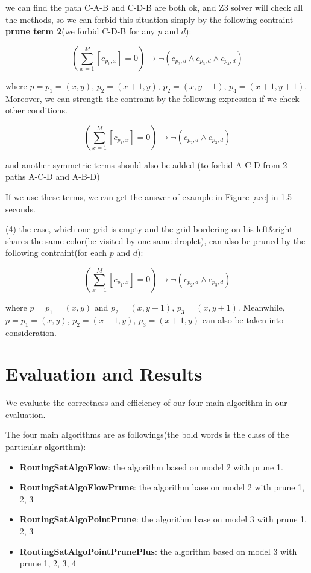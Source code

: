 \documentclass[twocolumn]{article}
\begin{document}
we can find the path C-A-B and C-D-B are both ok, and Z3 solver will check all the methods, so we can forbid this situation simply by the following contraint \textbf{prune term 2}(we forbid C-D-B for any $p$ and $d$):

\[
(\sum_{x=1}^{M}{[c_{p_1,x}]} = 0) \to \neg(c_{p_2,d} \wedge c_{p_3,d} \wedge c_{p_4,d})
\]

where $p = p_1 = (x, y)$, $p_2 = (x + 1, y)$, $p_2 = (x, y + 1)$, $p_4 = (x + 1, y + 1)$. Moreover, we can strength the contraint by the following expression if we check other conditions.

\[
(\sum_{x=1}^{M}{[c_{p_1,x}]} = 0) \to \neg(c_{p_2,d} \wedge c_{p_3,d})
\]

and another symmetric terms should also be added (to forbid A-C-D from 2 paths A-C-D and A-B-D)

If we use these terms, we can get the answer of example in Figure \ref{aee} in 1.5 seconds.

(4) the case, which one grid is empty and the grid bordering on his left\&right shares the same color(be visited by one same droplet), can also be pruned by the following contraint(for each $p$ and $d$):

\[
(\sum_{x=1}^{M}{[c_{p_1,x}]} = 0) \to \neg(c_{p_2,d} \wedge c_{p_3,d})
\]

where $p = p_1 = (x, y)$ and $p_2 = (x, y - 1)$, $p_3 = (x, y + 1)$. Meanwhile, $p = p_1 = (x, y)$, $p_2 = (x - 1, y)$, $p_3 = (x + 1, y)$ can also be taken into consideration.

\section{Evaluation and Results}

We evaluate the correctness and efficiency of our four main algorithm in our evaluation.

The four main algorithms are as followings(the bold words is the class of the particular algorithm):

\begin{itemize}
    \item \textbf{RoutingSatAlgoFlow}: the algorithm based on model 2 with prune 1.
    \item \textbf{RoutingSatAlgoFlowPrune}: the algorithm base on model 2 with prune 1, 2, 3
    \item \textbf{RoutingSatAlgoPointPrune}: the algorithm base on model 3 with prune 1, 2, 3
    \item \textbf{RoutingSatAlgoPointPrunePlus}: the algorithm based on model 3 with prune 1, 2, 3, 4
\end{itemize}
\end{document}
